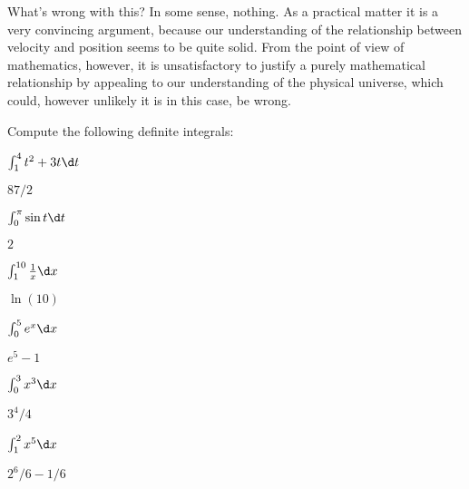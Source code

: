 What's wrong with this? In some sense, nothing. As a practical matter
it is a very convincing argument, because our understanding of the
relationship between velocity and position seems to be quite
solid. From the point of view of mathematics, however, it is
unsatisfactory to justify a purely mathematical relationship by
appealing to our understanding of the physical universe, which could,
however unlikely it is in this case, be wrong.














\begin{exercises}
\noindent Compute the following definite integrals:

\twocol

\begin{exercise} $\int_1^4 t^2+3t\d t$
\begin{answer} $87/2$
\end{answer}\end{exercise}

\begin{exercise} $\int_0^\pi \sin t\d t$
\begin{answer} $2$
\end{answer}\end{exercise}

\begin{exercise} $\int_1^{10} {1\over x}\d x$
\begin{answer} $\ln(10)$
\end{answer}\end{exercise}

\begin{exercise} $\int_0^5 e^x\d x$
\begin{answer} $e^5-1$
\end{answer}\end{exercise}

\begin{exercise} $\int_0^3 x^3\d x$
\begin{answer} $3^4/4$
\end{answer}\end{exercise}

\begin{exercise} $\int_1^2 x^5\d x$
\begin{answer} $2^6/6 -1/6$
\end{answer}\end{exercise}



\end{exercises}
